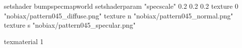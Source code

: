 setshader bumpspecmapworld
setshaderparam "specscale" 0.2 0.2 0.2
   texture 0 "nobiax/pattern045_diffuse.png"
   texture n "nobiax/pattern045_normal.png"
   texture s "nobiax/pattern045_specular.png"

texmaterial 1
